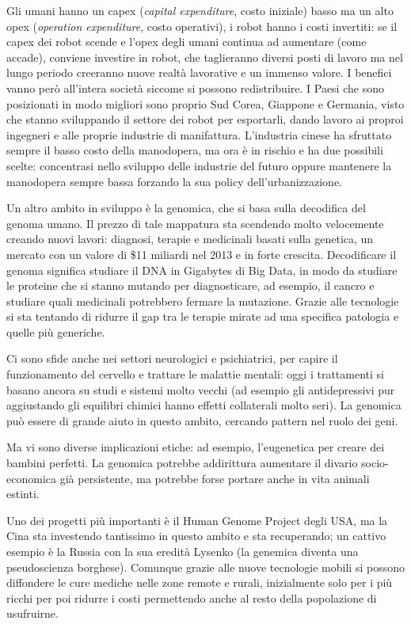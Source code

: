 \documentclass[a4page, 11pt]{article}
\begin{document}
Gli umani hanno un capex (\textit{capital expenditure}, costo iniziale) basso ma un alto opex (\textit{operation expenditure}, costo operativi), i robot hanno i costi invertiti: se il capex dei robot scende e l'opex degli umani continua ad aumentare (come accade), conviene investire in robot, che taglieranno diversi posti di lavoro ma nel lungo periodo creeranno nuove realtà lavorative e un immenso valore.
I benefici vanno però all'intera società siccome si possono redistribuire.
I Paesi che sono posizionati in modo migliori sono proprio Sud Corea, Giappone e Germania, visto che stanno sviluppando il settore dei robot per esportarli, dando lavoro ai proproi ingegneri e alle proprie industrie di manifattura.
L'industria cinese ha sfruttato sempre il basso costo della manodopera, ma ora è in rischio e ha due possibili scelte: concentrasi nello sviluppo delle industrie del futuro oppure mantenere la manodopera sempre bassa forzando la sua policy dell'urbanizzazione.

Un altro ambito in sviluppo è la genomica, che si basa sulla decodifica del genoma umano.
Il prezzo di tale mappatura sta scendendo molto velocemente creando nuovi lavori: diagnosi, terapie e medicinali basati sulla genetica, un mercato con un valore di \$11 miliardi nel 2013 e in forte crescita.
Decodificare il genoma significa studiare il DNA in Gigabytes di Big Data, in modo da studiare le proteine che si stanno mutando per diagnosticare, ad esempio, il cancro e studiare quali medicinali potrebbero fermare la mutazione.
Grazie alle tecnologie si sta tentando di ridurre il gap tra le terapie mirate ad una specifica patologia e quelle più generiche.

Ci sono sfide anche nei settori neurologici e psichiatrici, per capire il funzionamento del cervello e trattare le malattie mentali: oggi i trattamenti si basano ancora su studi e sistemi molto vecchi (ad esempio gli antidepressivi pur aggiustando gli equilibri chimici hanno effetti collaterali molto seri).
La genomica può essere di grande aiuto in questo ambito, cercando pattern nel ruolo dei geni.

Ma vi sono diverse implicazioni etiche: ad esempio, l'eugenetica per creare dei bambini perfetti.
La genomica potrebbe addirittura aumentare il divario socio-economica già persistente, ma potrebbe forse portare anche in vita animali estinti.

Uno dei progetti più importanti è il Human Genome Project degli USA, ma la Cina sta investendo tantissimo in questo ambito e sta recuperando; un cattivo esempio è la Russia con la sua eredità Lysenko (la genemica diventa una pseudoscienza borghese).
Comunque grazie alle nuove tecnologie mobili si possono diffondere le cure mediche nelle zone remote e rurali, inizialmente solo per i più ricchi per poi ridurre i costi permettendo anche al resto della popolazione di usufruirne.
\end{document}
